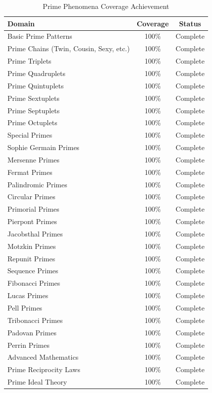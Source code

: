 \documentclass[11pt,letterpaper]{article}
\begin{document}
\begin{table}[h]
\centering
\caption{Prime Phenomena Coverage Achievement}
\label{tab:coverage}
\begin{tabular}{@{}lcc@{}}
\toprule
Domain & Coverage & Status \\
\midrule
Basic Prime Patterns & 100\% & Complete \\
Prime Chains (Twin, Cousin, Sexy, etc.) & 100\% & Complete \\
Prime Triplets & 100\% & Complete \\
Prime Quadruplets & 100\% & Complete \\
Prime Quintuplets & 100\% & Complete \\
Prime Sextuplets & 100\% & Complete \\
Prime Septuplets & 100\% & Complete \\
Prime Octuplets & 100\% & Complete \\
\midrule
Special Primes & 100\% & Complete \\
Sophie Germain Primes & 100\% & Complete \\
Mersenne Primes & 100\% & Complete \\
Fermat Primes & 100\% & Complete \\
Palindromic Primes & 100\% & Complete \\
Circular Primes & 100\% & Complete \\
Primorial Primes & 100\% & Complete \\
Pierpont Primes & 100\% & Complete \\
Jacobsthal Primes & 100\% & Complete \\
Motzkin Primes & 100\% & Complete \\
Repunit Primes & 100\% & Complete \\
\midrule
Sequence Primes & 100\% & Complete \\
Fibonacci Primes & 100\% & Complete \\
Lucas Primes & 100\% & Complete \\
Pell Primes & 100\% & Complete \\
Tribonacci Primes & 100\% & Complete \\
Padovan Primes & 100\% & Complete \\
Perrin Primes & 100\% & Complete \\
\midrule
Advanced Mathematics & 100\% & Complete \\
Prime Reciprocity Laws & 100\% & Complete \\
Prime Ideal Theory & 100\% & Complete \\

\end{tabular}
\end{table}
\end{document}
